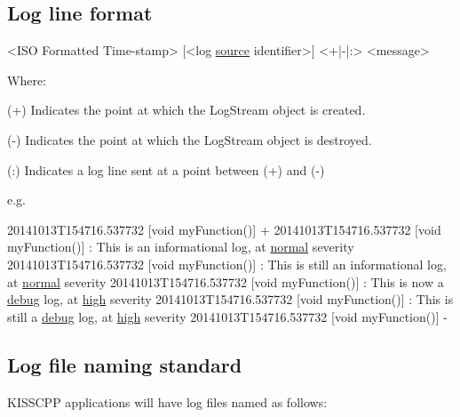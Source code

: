 \subsection*{Log line format}


\begin{DoxyCode}
<ISO Formatted Time-stamp> [<log \hyperlink{namespacekisscpp_1_1manip_1_1helpers_a97784407250b5ea47c0b20441a7472e5}{source} identifier>] <+|-|:> <message>
\end{DoxyCode}


Where\-:
\begin{DoxyItemize}
\item (+) Indicates the point at which the Log\-Stream object is created.
\item (-\/) Indicates the point at which the Log\-Stream object is destroyed.
\item (\-:) Indicates a log line sent at a point between (+) and (-\/)
\end{DoxyItemize}

e.\-g. 
\begin{DoxyCode}
20141013T154716.537732 [\textcolor{keywordtype}{void} myFunction()] +
20141013T154716.537732 [\textcolor{keywordtype}{void} myFunction()] : This is an informational log, at 
      \hyperlink{namespacekisscpp_1_1manip_a8f9aa3f28fd54225dee006e014efcf65}{normal} severity
20141013T154716.537732 [\textcolor{keywordtype}{void} myFunction()] : This is still an informational log, at 
      \hyperlink{namespacekisscpp_1_1manip_a8f9aa3f28fd54225dee006e014efcf65}{normal} severity
20141013T154716.537732 [\textcolor{keywordtype}{void} myFunction()] : This is now a \hyperlink{namespacekisscpp_1_1manip_a795be5b59b6a02e1d8f6d9d5bb41c3a4}{debug} log, at 
      \hyperlink{namespacekisscpp_1_1manip_a210331dfe6a9773c4e8e1db1e889820b}{high} severity
20141013T154716.537732 [\textcolor{keywordtype}{void} myFunction()] : This is still a \hyperlink{namespacekisscpp_1_1manip_a795be5b59b6a02e1d8f6d9d5bb41c3a4}{debug} log, at 
      \hyperlink{namespacekisscpp_1_1manip_a210331dfe6a9773c4e8e1db1e889820b}{high} severity
20141013T154716.537732 [\textcolor{keywordtype}{void} myFunction()] -
\end{DoxyCode}


\subsection*{Log file naming standard}

K\-I\-S\-S\-C\-P\-P applications will have log files named as follows\-:


